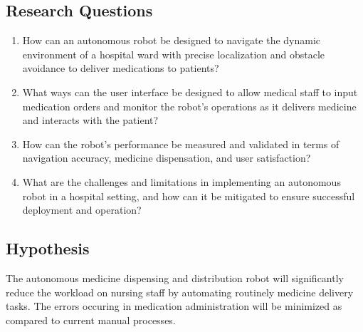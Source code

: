 \subsection{Research Questions}
\begin{enumerate}[label=\alph*)]
    \item How can an autonomous robot be designed to navigate the dynamic environment of a hospital ward
    with precise localization and obstacle avoidance to deliver medications to patients?
    \item What ways can the user interface be designed to allow medical staff to input medication orders and monitor the robot's operations as it delivers medicine and interacts with the patient? 
    \item How can the robot's performance be measured and validated in terms of navigation accuracy, medicine dispensation, and user satisfaction? 
    \item What are the challenges and limitations in implementing an autonomous robot in a hospital setting, and how can it be mitigated to ensure successful deployment and operation?
\end{enumerate}



\subsection{Hypothesis}
The autonomous medicine dispensing and distribution robot will significantly reduce the workload on nursing staff by automating routinely medicine delivery tasks. The errors occuring in medication administration will be minimized as compared to current manual processes. 